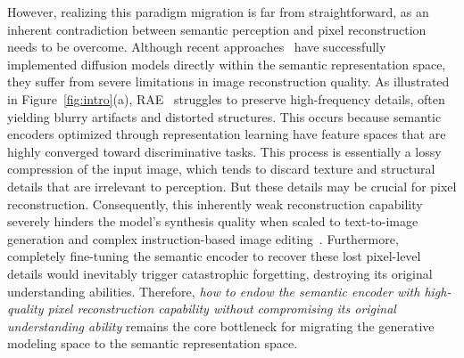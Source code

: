 \documentclass[runningheads]{llncs}
\newcommand{\lc}[1]{{\color{blue}{$^\textbf{\emph{Long:}}$[#1]}}}
\begin{document}


However, realizing this paradigm migration is far from straightforward, as an inherent contradiction between semantic perception and pixel reconstruction needs to be overcome.
Although recent approaches~\cite{rae,va-vae} have successfully implemented diffusion models directly within the semantic representation space, they suffer from severe limitations in image reconstruction quality.
As illustrated in Figure~\ref{fig:intro}(a), RAE~\cite{rae} struggles to preserve high-frequency details, often yielding blurry artifacts and distorted structures.
This occurs because semantic encoders optimized through representation learning have feature spaces that are highly converged toward discriminative tasks. This process is essentially a lossy compression of the input image, which tends to discard texture and structural details that are irrelevant to perception. But these details may be crucial for pixel reconstruction. 
Consequently, this inherently weak reconstruction capability severely hinders the model's synthesis quality when scaled to text-to-image generation and complex instruction-based image editing~\cite{psvae}.
Furthermore, completely fine-tuning the semantic encoder to recover these lost pixel-level details would inevitably trigger catastrophic forgetting, destroying its original understanding abilities.
Therefore, {\emph{how to endow the semantic encoder with high-quality pixel reconstruction capability without compromising its original understanding ability}} remains the core bottleneck for migrating the generative modeling space to the semantic representation space.
\end{document}
